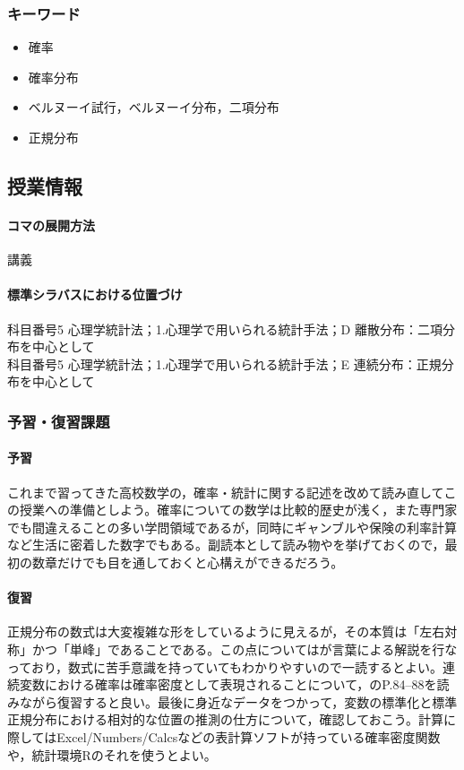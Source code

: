 \subsubsection{キーワード}
\begin{itemize}
	\item 確率
	\item 確率分布
	\item ベルヌーイ試行，ベルヌーイ分布，二項分布
	\item 正規分布
\end{itemize}
\subsection{授業情報}
\paragraph{コマの展開方法}
講義
\paragraph{標準シラバスにおける位置づけ}
科目番号5 心理学統計法；1.心理学で用いられる統計手法；D 離散分布：二項分布を中心として\\
科目番号5 心理学統計法；1.心理学で用いられる統計手法；E 連続分布：正規分布を中心として

\subsubsection{予習・復習課題}
\paragraph{予習}
これまで習ってきた高校数学の，確率・統計に関する記述を改めて読み直してこの授業への準備としよう。確率についての数学は比較的歴史が浅く，また専門家でも間違えることの多い学問領域であるが，同時にギャンブルや保険の利率計算など生活に密着した数字でもある。副読本として読み物\textcite{Hamada201812}や\textcite{Maeda2017}を挙げておくので，最初の数章だけでも目を通しておくと心構えができるだろう。
\paragraph{復習}
正規分布の数式は大変複雑な形をしているように見えるが，その本質は「左右対称」かつ「単峰」であることである。この点については\textcite{Naganuma2201611}が言葉による解説を行なっており，数式に苦手意識を持っていてもわかりやすいので一読するとよい。連続変数における確率は確率密度として表現されることについて，\textcite{Maeda2017}のP.84--88を読みながら復習すると良い。最後に身近なデータをつかって，変数の標準化と標準正規分布における相対的な位置の推測の仕方について，確認しておこう。計算に際してはExcel/Numbers/Calcsなどの表計算ソフトが持っている確率密度関数や，統計環境Rのそれを使うとよい。